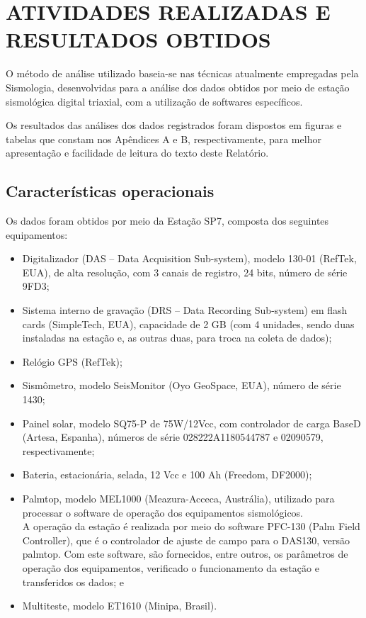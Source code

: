 \section{ATIVIDADES REALIZADAS E RESULTADOS OBTIDOS}
\par{O método de análise utilizado baseia-se nas técnicas atualmente empregadas pela Sismologia, desenvolvidas para a análise dos dados obtidos por meio de estação sismológica digital triaxial, com a utilização de softwares específicos.}

\par{Os resultados das análises dos dados registrados foram dispostos em figuras e tabelas que constam nos Apêndices A e B, respectivamente, para melhor apresentação e facilidade de leitura do texto deste Relatório.}

\subsection{Características operacionais}
\label{subsec:caracteristicas}
\par{Os dados foram obtidos por meio da Estação SP7, composta dos seguintes equipamentos:}
\begin{itemize}
    \item Digitalizador (DAS – Data Acquisition Sub-system), modelo 130-01 (RefTek, EUA), de alta resolução, com 3 canais de registro, 24 bits, número de série 9FD3;
    \item Sistema interno de gravação (DRS – Data Recording Sub-system) em flash cards (SimpleTech, EUA), capacidade de 2 GB (com 4 unidades, sendo duas instaladas na estação e, as outras duas, para troca na coleta de dados);
    \item Relógio GPS (RefTek);
    \item Sismômetro, modelo SeisMonitor (Oyo GeoSpace, EUA), número de série 1430;
    \item Painel solar, modelo SQ75-P de 75W/12Vcc, com controlador de carga BaseD (Artesa, Espanha), números de série 028222A1180544787 e 02090579, respectivamente;
    \item Bateria, estacionária, selada, 12 Vcc e 100 Ah (Freedom, DF2000);
    \item Palmtop, modelo MEL1000 (Meazura-Acceca, Austrália), utilizado para processar o software de operação dos equipamentos sismológicos. \\
A operação da estação é realizada por meio do software PFC-130 (Palm Field Controller), que é o controlador de ajuste de campo para o DAS130, versão palmtop. Com este software, são fornecidos, entre outros, os parâmetros de operação dos equipamentos, verificado o funcionamento da estação e transferidos os dados; e
    \item Multiteste, modelo ET1610 (Minipa, Brasil).
\end{itemize}

